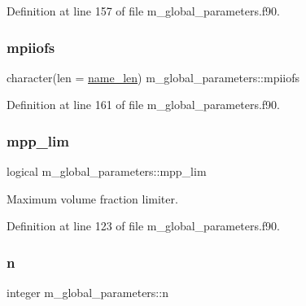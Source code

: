 Definition at line 157 of file m\+\_\+global\+\_\+parameters.\+f90.

\mbox{\label{namespacem__global__parameters_ad4713c1e89eaa8fac3bb2181ba87b192}} 
\subsubsection{\texorpdfstring{mpiiofs}{mpiiofs}}
{\footnotesize\ttfamily character(len = \hyperlink{namespacem__global__parameters_ac8252b115e717c6f1c8595be6f897df7}{name\+\_\+len}) m\+\_\+global\+\_\+parameters\+::mpiiofs}



Definition at line 161 of file m\+\_\+global\+\_\+parameters.\+f90.

\mbox{\label{namespacem__global__parameters_adc35ba450a192812db36f1d6659d64e6}} 
\subsubsection{\texorpdfstring{mpp\+\_\+lim}{mpp\_lim}}
{\footnotesize\ttfamily logical m\+\_\+global\+\_\+parameters\+::mpp\+\_\+lim}



Maximum volume fraction limiter. 



Definition at line 123 of file m\+\_\+global\+\_\+parameters.\+f90.

\mbox{\label{namespacem__global__parameters_ac72422e5f77149bd32cf0cfd01a36544}} 
\subsubsection{\texorpdfstring{n}{n}}
{\footnotesize\ttfamily integer m\+\_\+global\+\_\+parameters\+::n}



